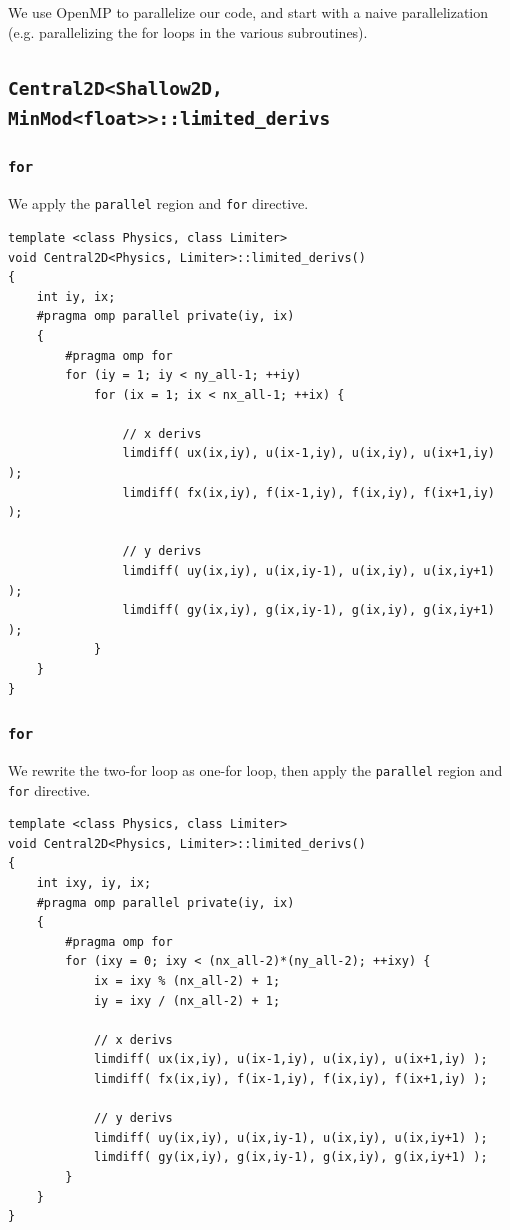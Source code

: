 \documentclass[12pt]{article}
\numberwithin{equation}{section}
\begin{document}
We use OpenMP to parallelize our code, and start with a naive parallelization (e.g. parallelizing the for loops in the various subroutines). 

\subsection{\texttt{Central2D<Shallow2D, MinMod<float>>::limited\_derivs}}

\subsubsection{\texttt{for}}

We apply the \texttt{parallel} region and \texttt{for} directive.
\begin{verbatim}
template <class Physics, class Limiter>
void Central2D<Physics, Limiter>::limited_derivs()
{
    int iy, ix;
    #pragma omp parallel private(iy, ix)
    {
        #pragma omp for
        for (iy = 1; iy < ny_all-1; ++iy)
            for (ix = 1; ix < nx_all-1; ++ix) {

                // x derivs
                limdiff( ux(ix,iy), u(ix-1,iy), u(ix,iy), u(ix+1,iy) );
                limdiff( fx(ix,iy), f(ix-1,iy), f(ix,iy), f(ix+1,iy) );

                // y derivs
                limdiff( uy(ix,iy), u(ix,iy-1), u(ix,iy), u(ix,iy+1) );
                limdiff( gy(ix,iy), g(ix,iy-1), g(ix,iy), g(ix,iy+1) );
            }
    }
}
\end{verbatim}

\subsubsection{\texttt{for}}

We rewrite the two-for loop as one-for loop, then apply the \texttt{parallel} region and \texttt{for} directive.
\begin{verbatim}
template <class Physics, class Limiter>
void Central2D<Physics, Limiter>::limited_derivs()
{
    int ixy, iy, ix;
    #pragma omp parallel private(iy, ix)
    {
        #pragma omp for
        for (ixy = 0; ixy < (nx_all-2)*(ny_all-2); ++ixy) {
            ix = ixy % (nx_all-2) + 1;
            iy = ixy / (nx_all-2) + 1;

            // x derivs
            limdiff( ux(ix,iy), u(ix-1,iy), u(ix,iy), u(ix+1,iy) );
            limdiff( fx(ix,iy), f(ix-1,iy), f(ix,iy), f(ix+1,iy) );

            // y derivs
            limdiff( uy(ix,iy), u(ix,iy-1), u(ix,iy), u(ix,iy+1) );
            limdiff( gy(ix,iy), g(ix,iy-1), g(ix,iy), g(ix,iy+1) );
        }
    }
}
\end{verbatim}
\end{document}
